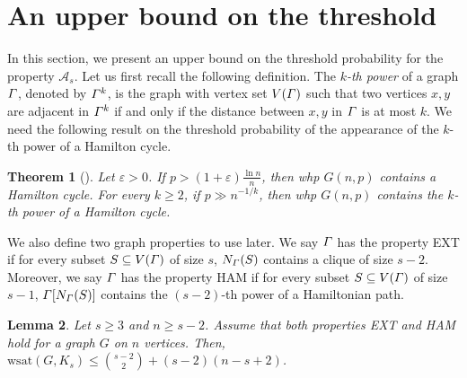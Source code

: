 \documentclass[hidelinks, 11pt]{article}
\theoremstyle{plain}
\newtheorem{theorem}{Theorem}[section]
\newtheorem{lemma}[theorem]{Lemma}
\theoremstyle{definition}
\begin{document}
\section{An  upper bound on the  threshold}\label{secUpperP}



In this section, we   present an  upper    bound on   the  threshold probability  for the property   $\mathcal{A}_s$. Let us first  recall the following definition.
The {\sl $k$-th power}  of a graph  $\mathnormal{\Gamma}$, denoted by $\mathnormal{\Gamma}^k$,  is the graph  with    vertex set $V(\mathnormal{\Gamma})$  such that two vertices $x, y$ are adjacent in $\mathnormal{\Gamma}^k$ if and only if the distance between  $x, y$  in  $\mathnormal{\Gamma}$  is at most $k$. We need the following result on the threshold probability of the appearance of the $k$-th power of a Hamilton cycle.

\begin{theorem}[\cite{kahn,posa,Riordan}]
Let $\varepsilon>0$. If $p>(1+\varepsilon)\frac{\ln n}{n}$, then whp $G(n,p)$ contains a Hamilton cycle. For every $k\geq 2$, if $p\gg n^{-1/k}$, then whp $G(n,p)$ contains the $k$-th power of a Hamilton cycle.
\label{th:Hamilton_powers}
\end{theorem}



We  also  define  two graph properties to use later.
We say     $\mathnormal{\Gamma}$ has the property {\sf EXT} if for every subset $S\subseteq V(\mathnormal{\Gamma})$  of size $s$, $N_\mathnormal{\Gamma}(S)$ contains a clique of size  $s-2$.
Moreover, we say   $\mathnormal{\Gamma}$ has the property {\sf HAM} if for every subset $S\subseteq V(\mathnormal{\Gamma})$  of size $s-1$,  $\mathnormal{\Gamma}[N_\mathnormal{\Gamma}(S)]$ contains the $(s-2)$-th power of a Hamiltonian path.



\begin{lemma}\label{11}
Let   $s\geq 3$   and     $n\geq s-2$. Assume that  both properties  {\sf EXT} and {\sf HAM} hold for a graph $G$ on $n$ vertices. Then,  $\mathrm{wsat}(G,K_s)\leq{s-2 \choose 2}+(s-2)(n-s+2)$.
\end{lemma}
\end{document}
